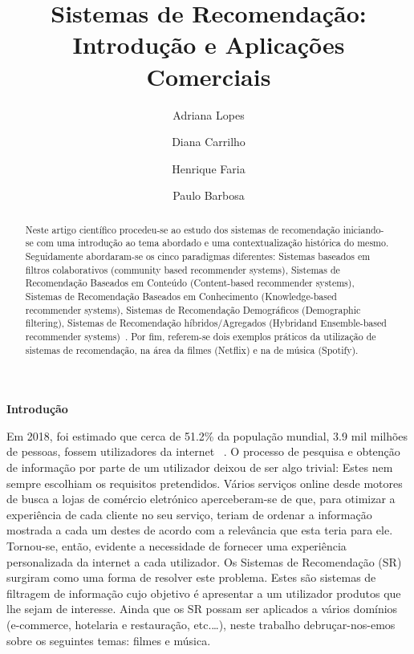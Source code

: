 %
\title{Sistemas de Recomendação: Introdução e Aplicações Comerciais}
%
%
\author{Adriana Lopes \and Diana Carrilho \and Henrique Faria \and Paulo Barbosa}
%
%
%
\maketitle              %
%
\begin{abstract}
Neste artigo científico procedeu-se ao estudo dos sistemas de recomendação iniciando-se com uma introdução ao tema abordado e uma contextualização histórica do mesmo. Seguidamente abordaram-se os cinco paradigmas diferentes: Sistemas baseados em filtros colaborativos (community based recommender systems), Sistemas de Recomendação Baseados em Conteúdo (Content-based recommender systems), Sistemas de Recomendação Baseados em Conhecimento
(Knowledge-based recommender systems), Sistemas de Recomendação Demográficos (Demographic filtering), Sistemas de Recomendação híbridos/Agregados (Hybridand Ensemble-based recommender systems)~\cite{ref_book1}. Por fim, referem-se dois exemplos práticos da utilização de sistemas de recomendação, na área da filmes (Netflix) e na de música (Spotify).\newline

\end{abstract}
%
%
\begin{center}
\normalsize{\bfseries Introdução}\hfill 
\end{center}
Em 2018, foi estimado que cerca de 51.2\% da população mundial, 3.9 mil milhões de pessoas, fossem utilizadores da internet~\cite{ref_intro1} . O processo de pesquisa e obtenção de informação por parte de um utilizador deixou de ser algo trivial: Estes nem sempre escolhiam os requisitos pretendidos. Vários serviços online desde motores de busca a lojas de comércio eletrónico aperceberam-se de que, para otimizar a experiência de cada cliente no seu serviço, teriam de ordenar a informação mostrada a cada um destes de acordo com a relevância que esta teria para ele. Tornou-se, então, evidente a necessidade de fornecer uma experiência personalizada da internet a cada utilizador.  
Os Sistemas de Recomendação (SR) surgiram como uma forma de resolver este problema. Estes são sistemas de filtragem de informação cujo objetivo é apresentar a um utilizador produtos que lhe sejam de interesse. 
Ainda que os SR possam ser aplicados a vários domínios (e-commerce, hotelaria e restauração, etc.…), neste trabalho debruçar-nos-emos sobre os seguintes temas: filmes e música. 





